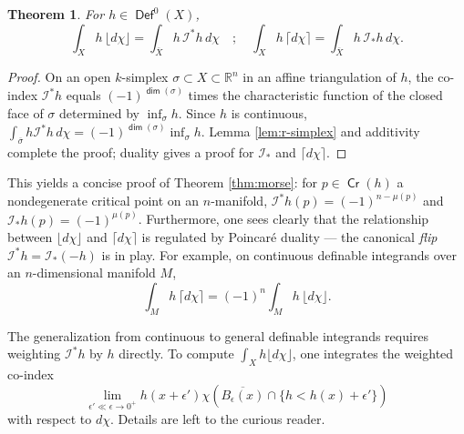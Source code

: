 \documentclass{psapm-l}
\newtheorem{theorem}{Theorem}[section]
\theoremstyle{definition}
\theoremstyle{remark}
\numberwithin{equation}{section}
\begin{document}
\begin{theorem}
\label{thm:stratified}
For $h\in{{{\operatorname{\mathsf{{Def}}}}}}^0(X)$,
\begin{equation}
\label{eq:morseindex}
        \int_X h\,{{\lfloor d\chi\rfloor}} = \int_{\overline{X}}h\,{{\mathcal I}}^*h\,d\chi
         \quad  ;  \quad
        \int_X h\,{{\lceil d\chi\rceil}}   = \int_{\overline{X}}h\,{{\mathcal I}}_*h\,d\chi
.
\end{equation}
\end{theorem}
\begin{proof}
On an open $k$-simplex $\sigma\subset X\subset{{\mathbb R}}^n$ in an affine triangulation of $h$, the co-index ${{\mathcal I}}^*h$ equals $(-1)^{{{{\operatorname{\mathsf{{dim}}}}}}(\sigma)}$ times the characteristic function of the closed face of $\sigma$ determined by $\inf_\sigma h$. Since $h$ is
continuous, $\int_{\overline{\sigma}}h{{\mathcal I}}^*h\,d\chi = (-1)^{{{{\operatorname{\mathsf{{dim}}}}}}(\sigma)}\inf_\sigma h$. Lemma \ref{lem:r-simplex} and additivity complete the proof; duality gives a proof for ${{\mathcal I}}_*$ and ${{\lceil d\chi\rceil}}$.
\end{proof}

This yields a concise proof of Theorem \ref{thm:morse}: for $p\in{{{\operatorname{\mathsf{{Cr}}}}}}(h)$ a nondegenerate critical point on an $n$-manifold, ${{\mathcal I}}^*h(p)=(-1)^{n-\mu(p)}$ and ${{\mathcal I}}_*h(p)=(-1)^{\mu(p)}$. Furthermore, one sees clearly that the relationship between ${{\lfloor d\chi\rfloor}}$ and ${{\lceil d\chi\rceil}}$ is regulated by Poincar\'e duality --- the canonical {\em flip} ${{\mathcal I}}^*h={{\mathcal I}}_*(-h)$ is in play. For example, on continuous definable integrands over an $n$-dimensional manifold $M$,
\begin{equation}
\label{eq:morse3}
    \int_M h\,{{\lceil d\chi\rceil}}
    =
    (-1)^n\int_M h\,{{\lfloor d\chi\rfloor}}
    .
\end{equation}

The generalization from continuous to general definable integrands requires weighting ${{\mathcal I}}^*h$ by $h$ directly. To compute $\int_X h{{\lfloor d\chi\rfloor}}$, one integrates the weighted co-index
\begin{equation}
        \lim_{\epsilon'\ll\epsilon\to 0^+}
        h(x+\epsilon')\chi\left(
        \overline{B_\epsilon(x)}
        \cap
        \{h<h(x)+\epsilon'\}
        \right)
\end{equation}
with respect to $d\chi$. Details are left to the curious reader.
\end{document}
